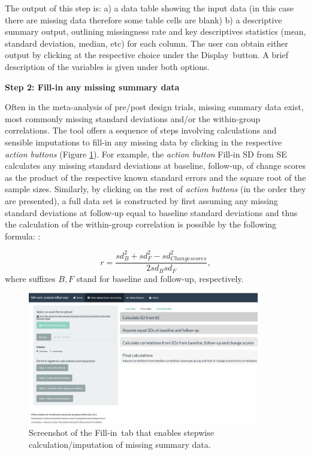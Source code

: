 \documentclass[AMA,STIX1COL]{WileyNJD-v2}
\begin{document}
The output of this step is: 
a) a data table showing the input data (in this case there are missing data therefore some table cells are blank)
b) a descriptive summary output, outlining missingness rate and key descriptives statistics (mean, standard deviation, median, etc) for each column. The user can obtain either output by clicking at the respective choice under the \textquotesingle Display\textquotesingle\ button. A brief description of the variables is given under both options.

\vspace{0.1cm}

\textbf{Step 2: Fill-in any missing summary data}
\vspace{0.1cm}

Often in the meta-analysis of pre/post design trials, missing summary data exist, most commonly missing standard deviations and/or the within-group correlations. The tool offers a sequence of steps involving calculations and sensible imputations to fill-in any missing data by clicking in the respective \textit{action buttons} (Figure \ref{fig:shiny_missing}). For example, the \textit{action button} \textquotesingle Fill-in SD from SE\textquotesingle\, calculates any missing standard deviations at baseline, follow-up, of change scores as the product of the respective known standard errors and the square root of the sample sizes.
Similarly, by clicking on the rest of \textit{action buttons} (in the order they are presented), a full data set is constructed by first assuming any missing standard deviations at follow-up equal to baseline standard deviations and thus the calculation of the within-group correlation is possible by the following formula: \citep{higgins2011chapter}:

\begin{equation*}
r = \frac{sd^2_{B}+sd^2_{F} - sd^2_{Changescores}}{2sd_{B}sd_{F}},
\end{equation*}
where suffixes $B, F$ stand for baseline and follow-up, respectively.

\begin{figure}[t]
   \centering \includegraphics[width=0.9\textwidth]{fill_empty.JPG}
    \caption{\small {Screenshot of the \textquotesingle Fill-in\textquotesingle\ tab that enables stepwise calculation/imputation of missing summary data.}} \label{fig:shiny_missing}
\end{figure}
\end{document}
